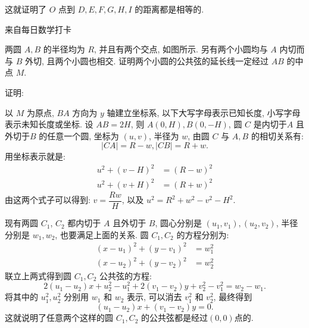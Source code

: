 这就证明了 $O$ 点到 $D,E,F,G,H,I$ 的距离都是相等的.

\newpage
\noindent 来自每日数学打卡

两圆 $A,B$ 的半径均为 $R$, 并且有两个交点, 如图所示. 另有两个小圆均与 $A$ 内切而与 $B$ 外切, 且两个小圆也相交. 证明两个小圆的公共弦的延长线一定经过 $AB$ 的中点 $M$.

\begin{figure*}[htbp]
\centering
{}
\end{figure*}

\noindent 证明: 

以 $M$ 为原点, $BA$ 方向为 $y$ 轴建立坐标系, 以下大写字母表示已知长度, 小写字母表示未知长度或坐标. 设 $AB = 2H$, 则 $A(0,H), B(0,-H)$, 圆 $C$ 是内切于$A$ 且外切于$B$ 的任意一个圆, 坐标为 $(u,v)$, 半径为 $w$, 由圆 $C$ 与 $A,B$ 的相切关系有: 
\[ |CA| = R-w, |CB| = R+w. \]
用坐标表示就是:
\begin{align*}
u^2 + (v-H)^2 &= (R-w)^2 \\
u^2 + (v+H)^2 &= (R+w)^2
\end{align*}
由这两个式子可以得到: $v = \dfrac{Rw}{H}$, 以及 $u^2 = R^2+w^2-v^2-H^2$.

现有两圆 $C_1$, $C_2$ 都内切于 $A$ 且外切于 $B$, 圆心分别是 $(u_1,v_1), (u_2,v_2)$, 半径分别是 $w_1, w_2$, 也要满足上面的关系. 圆 $C_1, C_2$ 的方程分别为:
\begin{align*}
(x-u_1)^2 + (y-v_1)^2 &= w_1^2 \\
(x-u_2)^2 + (y-v_2)^2 &= w_2^2 
\end{align*}
联立上两式得到圆 $C_1, C_2$ 公共弦的方程:
\[ 2(u_1-u_2)x + u_2^2-u_1^2 + 2(v_1-v_2)y + v_2^2-v_1^2=w_2-w_1 .\]
将其中的 $u_1^2, u_2^2$ 分别用 $w_1$ 和 $w_2$ 表示, 可以消去 $v_1^2$ 和 $v_2^2$, 最终得到
\[ (u_1-u_2)x+(v_1-v_2)y=0 .\]
这就说明了任意两个这样的圆 $C_1, C_2$ 的公共弦都是经过$(0,0)$点的.


